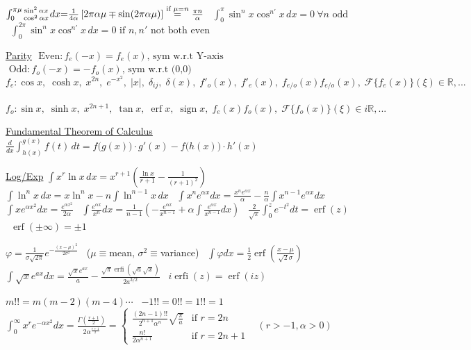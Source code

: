 {$\int_0^{\pi\mu}\!\genfrac{}{}{0pt}{}{\sin^2\alpha x}{\cos^2\alpha x}dx{=}\frac{1}{4\alpha}\left[2\pi\alpha\mu\mp\sin(2\pi\alpha\mu)\right]\stackrel{\text{if }\mu{=}n}{=}\frac{\pi n}{\alpha}$ \
$\int_0^\pi\!\sin^nx\cos^{n'}x\,dx{=}0\ \forall n\text{ odd}$ \
$\int_0^{2\pi}\!\sin^nx\cos^{n'}\!x\,dx{=}0\text{ if }n,n'\text{ not both even}$

\underline{Parity} 
$\text{ Even}: f_e(-x) = f_e(x)\text{, sym w.r.t Y-axis}$
$\text{ Odd}: f_o(-x) = -f_o(x)\text{, sym w.r.t (0,0)}$  
\  
\scriptsize{$f_e\!: \! \cos x,\; \!\cosh x,\;\! x^{2n},\;\! e^{-x^2},\;\! |x|,\;\! \delta_{ij},\;\! \delta(x), \;\!  f'_o(x), \; \! f'_e(x),\;\! f_{\!e\!/\!o}\!(x)f_{\!e\!/\!o}\!(x), \;\!\mathcal{F}\{f_e(x)\} (\xi) \in \!\mathbb{R},\!...$} \ 
\scriptsize{$f_o\!:  \sin x,\; \sinh x,\; x^{2n+1},\; \tan x,\; \operatorname{erf}x,\; \operatorname{sign}x,\; f_e (x) f_o (x), \;\mathcal{F}\{f_o(x)\} (\xi) \in i\mathbb{R},...$}

\underline{Fundamental Theorem of Calculus}
$\frac{d}{dx}\int_{h(x)}^{g(x)} f(t) \, dt =  f\big(g(x)\big) \cdot g'(x) - f\big(h(x)\big) \cdot h'(x)$
\vspace{1pt}

\underline{Log/Exp} 
$\int\!x^r\ln x\,dx{=}x^{r+1}\left(\frac{\ln x}{r+1}{-}\frac{1}{(r+1)^2}\right)$ \
$\int\!\ln^nx\,dx{=}x\ln^n x{-}n\int\!\ln^{n-1}x\,dx$ \
$\int\!x^ne^{\alpha x}dx{=}\frac{x^ne^{\alpha x}}{\alpha}{-}\frac{n}{\alpha}\int\!x^{n-1}e^{\alpha x}dx$ \
$\int\!xe^{\alpha x^2}dx{=}\frac{e^{\alpha x^2}}{2\alpha}$ \
$\int\!\frac{e^{\alpha x}}{x^n}dx{=}\frac{1}{n{-}1}\left({-}\frac{e^{\alpha x}}{x^{n-1}}{+}\alpha\int\!\frac{e^{\alpha x}}{x^{n-1}}dx\right)$ \
$\frac{2}{\sqrt{\pi}}\int_0^ze^{-t^2}dt{=}\operatorname{erf}(z)$ \ $\operatorname{erf}(\pm \infty){=}\pm1$

$\varphi{=}\frac{1}{\sigma\sqrt{2\pi}}e^{-\frac{(x-\mu)^2}{2\sigma^2}}$ \ ($\mu{\equiv}$mean, $\sigma^2{\equiv}$variance) \
$\int\!\varphi dx{=}\frac{1}{2}\operatorname{erf}\left(\frac{x{-}\mu}{\sqrt{2}\sigma}\right)$ \
$\int\!\sqrt{x}e^{ax}dx{=}\frac{\sqrt{x}e^{ax}}{a}{-}\frac{\sqrt{\pi}\operatorname{erfi}(\sqrt{a}\sqrt{x})}{2a^{3/2}}$ \ $i\operatorname{erfi}(z){=}\operatorname{erf}(iz)$

$m!!{=}m(m{-}2)(m{-}4)\cdots$ \ ${-}1!!{=}0!!{=}1!!{=}1$ \
$\int_0^\infty\!x^re^{-\alpha x^2}dx{=}\frac{\Gamma\left(\frac{r+1}{2}\right)}{2\alpha^{\frac{r+1}{2}}}{=}\begin{cases}
\frac{(2n{-}1)!!}{2^{n+1}\alpha^n}\sqrt{\frac{\pi}{a}} & \text{if }r{=}2n \\
\frac{n!}{2\alpha^{n+1}} & \text{if }r{=}2n{+}1
\end{cases}$ \ {\scriptsize$(r{>}{-}1,\alpha{>}0)$}

}
